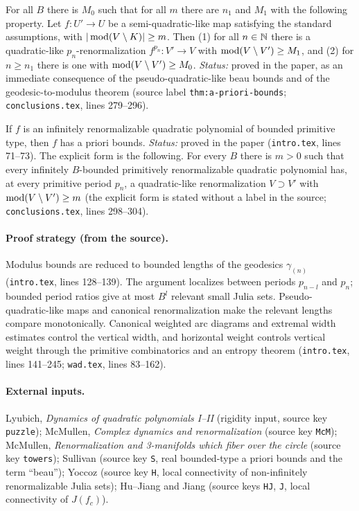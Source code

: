 \begin{theorem}
\label{thm:kahn-I-beau-semi}
For all $B$ there is $M_0$ such that for all $m$ there are $n_1$ and $M_1$ with the following property.  Let
$f\colon U'\to U$ be a semi-quadratic-like map satisfying the standard assumptions, with $|\operatorname{mod}(V\setminus K)|\ge m$.
Then (1) for all $n\in\mathbb N$ there is a quadratic-like $p_n$-renormalization $f^{p_n}\colon V'\to V$ with
$\operatorname{mod}(V\setminus V')\ge M_1$, and (2) for $n\ge n_1$ there is one with $\operatorname{mod}(V\setminus V')\ge M_0$.
\emph{Status:} proved in the paper, as an immediate consequence of the pseudo-quadratic-like beau bounds and of the
geodesic-to-modulus theorem (source label \texttt{thm:a-priori-bounds}; \texttt{conclusions.tex}, lines 279--296).
\end{theorem}

\begin{theorem}
\label{thm:kahn-I-main}
If $f$ is an infinitely renormalizable quadratic polynomial of bounded primitive type, then
$f$ has a priori bounds.  \emph{Status:} proved in the paper (\texttt{intro.tex}, lines
71--73).  The explicit form is the following.  For every $B$
there is $m>0$ such that every infinitely $B$-bounded primitively renormalizable quadratic
polynomial has, at every primitive period $p_n$, a quadratic-like renormalization $V\supset V'$
with $\operatorname{mod}(V\setminus V')\ge m$ (the explicit form is stated without a label in the source;
\texttt{conclusions.tex}, lines 298--304).
\end{theorem}

\paragraph{Proof strategy (from the source).}
Modulus bounds are reduced to bounded lengths of the geodesics $\gamma_{(n)}$
(\texttt{intro.tex}, lines 128--139).  The argument localizes between periods $p_{n-l}$ and
$p_n$; bounded period ratios give at most $B^l$ relevant small Julia sets.  Pseudo-quadratic-like
maps and canonical renormalization make the relevant lengths compare monotonically.  Canonical
weighted arc diagrams and extremal width estimates control the vertical width, and horizontal
weight controls vertical weight through the primitive combinatorics and an entropy theorem
(\texttt{intro.tex}, lines 141--245; \texttt{wad.tex}, lines 83--162).

\paragraph{External inputs.}
Lyubich, \emph{Dynamics of quadratic polynomials I--II} (rigidity input, source key
\texttt{puzzle}); McMullen, \emph{Complex dynamics and renormalization} (source key
\texttt{McM}); McMullen, \emph{Renormalization and 3-manifolds which fiber over the circle}
(source key \texttt{towers}); Sullivan (source key \texttt{S}, real bounded-type a priori
bounds and the term ``beau''); Yoccoz (source key \texttt{H}, local connectivity of
non-infinitely renormalizable Julia sets); Hu--Jiang and Jiang (source keys \texttt{HJ},
\texttt{J}, local connectivity of $J(f_c)$).

